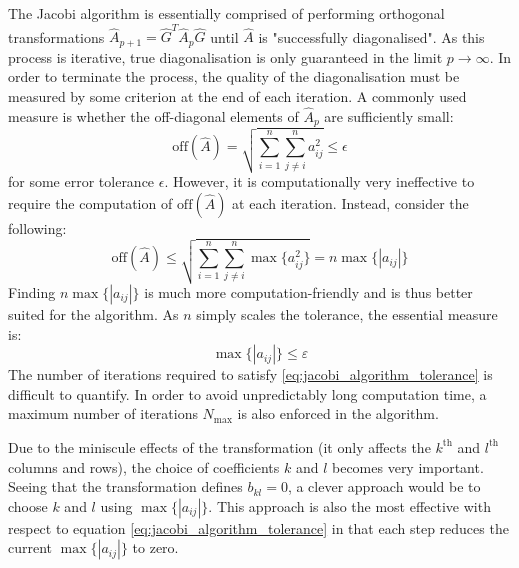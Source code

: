 \documentclass[reprint,english]{revtex4-1}
\begin{document}
The Jacobi algorithm is essentially comprised of performing orthogonal transformations \(\hat{A}_{p+1}=\hat{G}^T\hat{A}_p\hat{G}\) until \(\hat{A}\) is "successfully diagonalised". As this process is iterative, true diagonalisation is only guaranteed in the limit \(p\to\infty\). In order to terminate the process, the quality of the diagonalisation must be measured by some criterion at the end of each iteration. A commonly used measure is whether the off-diagonal elements of \(\hat{A}_p\) are sufficiently small:
\begin{equation}\label{eq:off_diagonal_frobenius}
\text{off}(\hat{A})=\sqrt{\sum_{i=1}^n\sum_{j\neq i}^na_{ij}^2}\leq\epsilon
\end{equation}
for some error tolerance \(\epsilon\). However, it is computationally very ineffective to require the computation of \(\text{off}(\hat{A})\) at each iteration. Instead, consider the following:
\begin{equation}\label{eq:off_diagonal_with_max}
\text{off}(\hat{A})\leq\sqrt{\sum_{i=1}^n\sum_{j\neq i}^n\max\{a_{ij}^2\}}=n\max\{|a_{ij}|\}
\end{equation}
Finding \(n\max\{|a_{ij}|\}\) is much more computation-friendly and is thus better suited for the algorithm. As \(n\) simply scales the tolerance, the essential measure is:
\begin{equation}\label{eq:jacobi_algorithm_tolerance}
\max\{|a_{ij}|\}\leq\varepsilon
\end{equation}
The number of iterations required to satisfy \eqref{eq:jacobi_algorithm_tolerance} is difficult to quantify. In order to avoid unpredictably long computation time, a maximum number of iterations \(N_{\text{max}}\) is also enforced in the algorithm.

Due to the miniscule effects of the transformation (it only affects the \(k^{\text{th}}\) and \(l^{\text{th}}\) columns and rows), the choice of coefficients \(k\) and \(l\) becomes very important. Seeing that the transformation defines \(b_{kl}=0\), a clever approach would be to choose \(k\) and \(l\) using \(\max\{|a_{ij}|\}\). This approach is also the most effective with respect to equation \eqref{eq:jacobi_algorithm_tolerance} in that each step reduces the current \(\max\{|a_{ij}|\}\) to zero.
\end{document}
